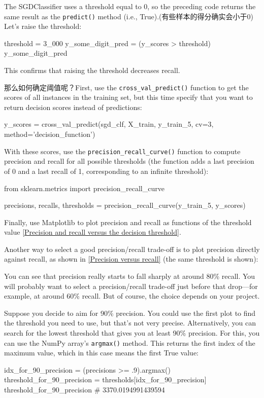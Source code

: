 The SGDClassifier uses a threshold equal to 0, so the preceding code returns the same result as the \verb|predict()| method (i.e., True).(有些样本的得分确实会小于0) Let's raise the threshold:
\begin{pyc}
    threshold = 3_000
    y_some_digit_pred = (y_scores > threshold)
    y_some_digit_pred
\end{pyc}

This confirms that raising the threshold decreases recall.

那么如何确定阈值呢？First, use the \verb|cross_val_predict()| function to get the scores of all instances in the training set, but this time specify that you want to return decision scores instead of predictions:
\begin{pyc}
    y_scores = cross_val_predict(sgd_clf,
    X_train,
    y_train_5,
    cv=3,
    method='decision_function')
\end{pyc}

With these scores, use the \verb|precision_recall_curve()| function to compute precision and recall for all possible thresholds (the function adds a last precision of 0 and a last recall of 1, corresponding to an infinite threshold):
\begin{pyc}
    from sklearn.metrics import precision_recall_curve

    precisions, recalls, thresholds = precision_recall_curve(y_train_5, y_scores)
\end{pyc}

Finally, use Matplotlib to plot precision and recall as functions of the threshold value \autoref{Precision and recall versus the decision threshold}.

Another way to select a good precision/recall trade-off is to plot precision directly against recall, as
shown in \autoref{Precision versus recall} (the same threshold is shown):

You can see that precision really starts to fall sharply at around 80\% recall. You will probably want to select a precision/recall trade-off just before that drop—for example, at around 60\% recall. But of course, the choice depends on your project.

Suppose you decide to aim for 90\% precision. You could use the first plot to find the threshold you need to use, but that's not very precise. Alternatively, you can search for the lowest threshold that gives you at least 90\% precision. For this, you can use the NumPy array's \verb|argmax()| method. This returns the first index of the maximum value, which in this case means the first True value:
\begin{pyc}
    idx_for_90_precision = (precisions >= .9).argmax()
    threshold_for_90_precision = thresholds[idx_for_90_precision]
    threshold_for_90_precision # 3370.0194991439594
\end{pyc}

